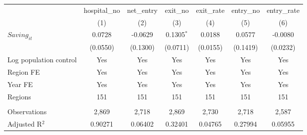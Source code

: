 \begingroup
\centering
\begin{tabular}{lcccccc}
   \toprule
                          & hospital\_no  & net\_entry  & exit\_no     & exit\_rate  & entry\_no  & entry\_rate \\    
                          & (1)           & (2)         & (3)          & (4)         & (5)        & (6)\\  
   \midrule 
   $Saving_{it}$          & 0.0728        & -0.0629     & 0.1305$^{*}$ & 0.0188      & 0.0577     & -0.0080\\   
                          & (0.0550)      & (0.1300)    & (0.0711)     & (0.0155)    & (0.1419)   & (0.0232)\\   
   Log population control & Yes           & Yes         & Yes          & Yes         & Yes        & Yes\\  
   Region FE              & Yes           & Yes         & Yes          & Yes         & Yes        & Yes\\  
   Year FE                & Yes           & Yes         & Yes          & Yes         & Yes        & Yes\\  
   Regions                & 151           & 151         & 151          & 151         & 151        & 151\\  
    \\
   Observations           & 2,869         & 2,718       & 2,869        & 2,730       & 2,718      & 2,587\\  
   Adjusted R$^2$         & 0.90271       & 0.06402     & 0.32401      & 0.04765     & 0.27994    & 0.05955\\  
   \bottomrule
\end{tabular}
\par\endgroup
